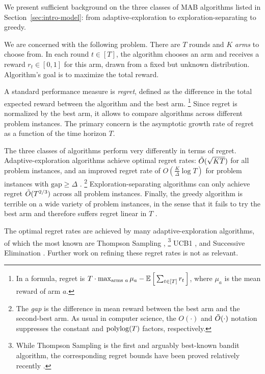 
We present sufficient background on the three classes of MAB algorithms listed in Section~\ref{sec:intro-model}: from adaptive-exploration to exploration-separating to greedy.

We are concerned with the following problem. There are $T$ rounds and $K$ \emph{arms} to choose from. In each round $t\in [T]$, the algorithm chooses an arm and receives a reward $r_t\in[0,1]$ for this arm, drawn from a fixed but unknown distribution. Algorithm's goal is to maximize the total reward.

A standard performance measure is \emph{regret}, defined as the difference in the total expected reward between the algorithm and the best arm.%
\footnote{In a formula, regret is
    $T\cdot \max_{\text{arms $a$}}\mu_a
    -  \E\sbr{ \sum_{t\in[T]} r_t }$,
where $\mu_a$ is the mean reward of arm $a$.}
Since regret is normalized by the best arm, it allows to compare algorithms across different problem instances.
The primary concern is the asymptotic growth rate of regret as a function of the time horizon $T$.

The three classes of algorithms perform very differently in terms of regret. Adaptive-exploration algorithms achieve optimal regret rates:
    $\tilde{O}(\sqrt{KT})$
for all problem instances, and an improved regret rate of
    $O(\tfrac{K}{\Delta}\log T)$
for problem instances with $\text{gap}\geq \Delta$
\citep{Lai-Robbins-85,bandits-ucb1,bandits-exp3}.%
\footnote{The \emph{gap} is the difference in mean reward between the best arm and the second-best arm. As usual in computer science, the $O(\cdot)$ and $\tilde{O}(\cdot)$ notation suppresses the constant and
$\polylog(T)$ factors, respectively.}
Exploration-separating algorithms can only achieve regret $\tilde{O}(T^{2/3})$ across all problem instances. Finally, the greedy algorithm is terrible on a wide variety of problem instances, in the sense that it fails to try the best arm and therefore suffers regret linear in $T$
\citep[see Chapter 11.2 in][]{slivkins-MABbook}.


The optimal regret rates are achieved by many adaptive-exploration  algorithms, of which the most known are
Thompson Sampling \citep{Thompson-1933,TS-survey-FTML18},%
\footnote{While Thompson Sampling is the first and arguably best-known bandit algorithm, the corresponding regret bounds have been proved relatively recently \citep{Shipra-colt12,Kaufmann-alt12,Shipra-aistats13}.}
UCB1 \citep{bandits-ucb1},
and Successive Elimination \citep{EvenDar-icml06}.
Further work on refining these regret rates is not as relevant.

